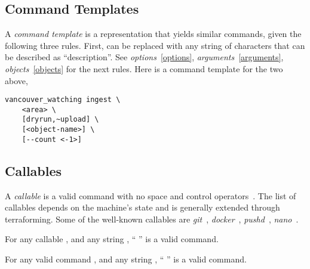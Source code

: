 \subsection{Command Templates}
\label{command-template}

A \emph{command template} is a representation that yields similar commands, given the following three rules. First,  can be replaced with any string of characters that can be described as ``description''. See \emph{options}~\ref{options}, \emph{arguments}~\ref{arguments}, \emph{objects}~\ref{objects} for the next rules. Here is a command template for the two above,
%
\begin{verbatim}
vancouver_watching ingest \
    <area> \
    [dryrun,~upload] \
    [<object-name>] \
    [--count <-1>]
\end{verbatim}

\subsection{Callables}
\label{callables}

A \emph{callable} is a valid command with no space and control operators~. The list of callables depends on the machine's state and is generally extended through terraforming. Some of the well-known callables are \emph{git}~, \emph{docker}~, \emph{pushd}~, \emph{nano}~. 

\begin{theorem}
For any callable , and any string , `` '' is a valid command.
\end{theorem}

\begin{theorem}
For any valid command \placeholder{command}, and any string \placeholder{suffix}, ``\placeholder{command} \placeholder{suffix}'' is a valid command.
\end{theorem}